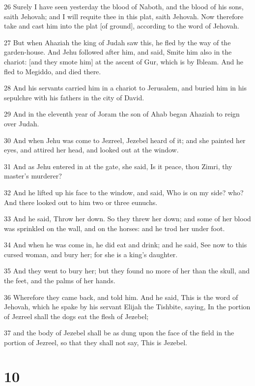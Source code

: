\par 26 Surely I have seen yesterday the blood of Naboth, and the blood of his sons, saith Jehovah; and I will requite thee in this plat, saith Jehovah. Now therefore take and cast him into the plat [of ground], according to the word of Jehovah.
\par 27 But when Ahaziah the king of Judah saw this, he fled by the way of the garden-house. And Jehu followed after him, and said, Smite him also in the chariot: [and they smote him] at the ascent of Gur, which is by Ibleam. And he fled to Megiddo, and died there.
\par 28 And his servants carried him in a chariot to Jerusalem, and buried him in his sepulchre with his fathers in the city of David.
\par 29 And in the eleventh year of Joram the son of Ahab began Ahaziah to reign over Judah.
\par 30 And when Jehu was come to Jezreel, Jezebel heard of it; and she painted her eyes, and attired her head, and looked out at the window.
\par 31 And as Jehu entered in at the gate, she said, Is it peace, thou Zimri, thy master's murderer?
\par 32 And he lifted up his face to the window, and said, Who is on my side? who? And there looked out to him two or three eunuchs.
\par 33 And he said, Throw her down. So they threw her down; and some of her blood was sprinkled on the wall, and on the horses: and he trod her under foot.
\par 34 And when he was come in, he did eat and drink; and he said, See now to this cursed woman, and bury her; for she is a king's daughter.
\par 35 And they went to bury her; but they found no more of her than the skull, and the feet, and the palms of her hands.
\par 36 Wherefore they came back, and told him. And he said, This is the word of Jehovah, which he spake by his servant Elijah the Tishbite, saying, In the portion of Jezreel shall the dogs eat the flesh of Jezebel;
\par 37 and the body of Jezebel shall be as dung upon the face of the field in the portion of Jezreel, so that they shall not say, This is Jezebel.

\chapter{10}

